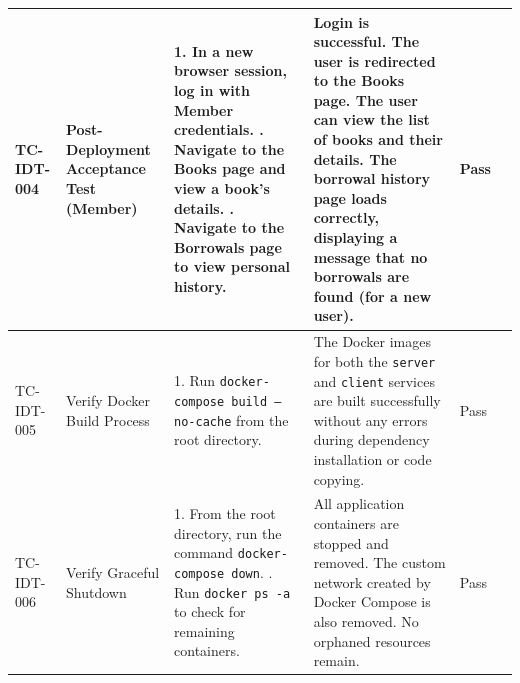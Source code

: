 \begin{longtable}{|p{}|p{}|p{}|p{}|p{}|p{}|}
    TC-IDT-004 & Post-Deployment Acceptance Test (Member) & 
    1. In a new browser session, log in with Member credentials. \newline
    2. Navigate to the Books page and view a book's details. \newline
    3. Navigate to the Borrowals page to view personal history. & 
    Login is successful. The user is redirected to the Books page.  The user can view the list of books and their details. The borrowal history page loads correctly, displaying a message that no borrowals are found (for a new user).  & Pass & \\
    \hline

    TC-IDT-005 & Verify Docker Build Process & 
    1. Run \texttt{docker-compose build --no-cache} from the root directory. & 
    The Docker images for both the \texttt{server} and \texttt{client} services are built successfully without any errors during dependency installation or code copying.  & Pass & \\
    \hline

    TC-IDT-006 & Verify Graceful Shutdown & 
    1. From the root directory, run the command \texttt{docker-compose down}. \newline
    2. Run \texttt{docker ps -a} to check for remaining containers. & 
    All application containers are stopped and removed. The custom network created by Docker Compose is also removed. No orphaned resources remain. & Pass & \\
    \hline

\end{longtable}
